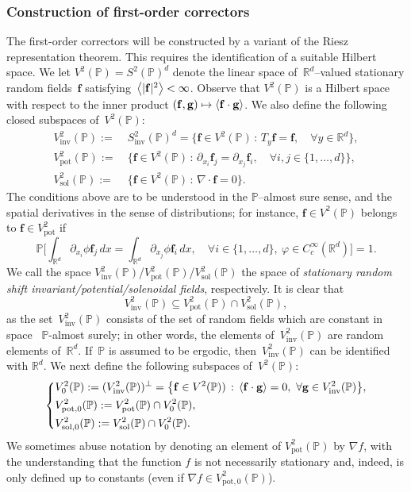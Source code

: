 \documentclass[11pt]{article} %
\numberwithin{equation}{section}
\theoremstyle{definition}
\let\originalleft\left
\let\originalright\right
\renewcommand{\left}{\mathopen{}\mathclose\bgroup\originalleft}
\renewcommand{\right}{\aftergroup\egroup\originalright}
\newcommand*{\Rd}{\ensuremath{\mathbb{R}^d}}
\newcommand{\f}{\mathbf{f}}
\newcommand{\g}{\mathbf{g}}
\newcommand{\pot}{\mathrm{pot}}
\newcommand{\sol}{\mathrm{sol}}
\newcommand{\inv}{\mathrm{inv}}
\renewcommand{\P}{\mathbb{P}}
\begin{document}
\subsubsection{Construction of first-order correctors}

The first-order correctors will be constructed by a variant of the Riesz representation theorem. This requires the identification of a suitable Hilbert space. We let $V^2(\P) = S^2(\P)^d$ denote the linear space of~$\Rd$--valued stationary random fields~$\f$ satisfying~$\left\langle |\f|^2 \right\rangle < \infty$. Observe that $V^2(\P)$ is a Hilbert space with respect to the inner product $(\f,\g) \mapsto \left\langle \f\cdot \g \right\rangle$. We also define the following closed subspaces of~$V^2(\P)$:
\begin{align*}
V^2_{\mathrm{inv}}(\P) := & \ S^2_{\mathrm{inv}}(\P)^d = 
\big\{
\f \in V^2(\P)\,:\, T_y \f = \f, \quad \forall y\in\Rd 
\big\}, 
\\ 
V^2_\pot(\P) 
:= & \
\big\{
\f \in V^2(\P)\,:\, \partial_{x_i} \f_j = \partial_{x_j} \f_i, \quad \forall i,j\in\{1,\ldots,d\}
\big\}, 
\\ 
V^2_\sol(\P) := &  \
\big\{
\f \in V^2(\P)\,:\, \nabla \cdot \f = 0
\big\}.
\end{align*}
The conditions above are to be understood in the $\P$--almost sure sense, and the spatial derivatives in the sense of distributions; for instance, $\f \in V^2(\P)$ belongs to $\f \in V^2_{\mathrm{pot}}$ if 
\begin{equation*}
\P \biggl[
\int_{\Rd} \partial_{x_i} \phi \f_j \,dx
=
\int_{\Rd} \partial_{x_j} \phi  \f_i \,dx, \quad
\forall i\in \{1,\ldots,d\},\  \varphi \in C^\infty_c(\Rd)
\biggr] = 1. 
\end{equation*}
We call the space $V^2_{\inv}(\P)$/$V^2_{\pot}(\P)$/$V^2_{\sol}(\P)$ the space of \emph{stationary random shift invariant/potential/solenoidal fields}, respectively. It is clear that 
\begin{equation*}
V^2_{\inv} (\P) \subseteq V^2_\pot(\P) \cap V^2_\sol(\P),
\end{equation*}
as the set~$V^2_{\inv}(\P)$ consists of the set of random fields which are constant in space ~$\P$-almost surely; in other words, the elements of~$V^2_{\mathrm{inv}}(\P)$ are random elements of~$\Rd$. If~$\P$ is assumed to be ergodic, then~$V^2_{\inv}(\P)$ can be identified with $\Rd$.
We next define the following subspaces of~$V^2(\P)$:
\begin{equation*}
\left\{
\begin{aligned}
& V^2_0(\P) := 
(V^2_{\inv}(\P))^\perp 
= 
\big\{
\f \in V^2(\P))\,:\, 
\langle \f\cdot \g \rangle = 0, \ \forall \g\in V^2_{\inv}(\P)
\big\}, 
\\
& V^2_{\pot,0}(\P)
:= 
V^2_{\pot}(\P)
\cap V^2_0(\P),
\\  &
V^2_{\sol,0}(\P)  
:= 
V^2_{\sol}(\P)
\cap V^2_0(\P).
\end{aligned}
\right.
\end{equation*}
We sometimes abuse notation by denoting an element of $V^2_\pot(\P)$ by $\nabla f$, with the understanding that the function $f$ is not necessarily stationary and, indeed, is only defined up to constants (even if $\nabla f \in V^2_{\pot,0}(\P)$). 
\end{document}
